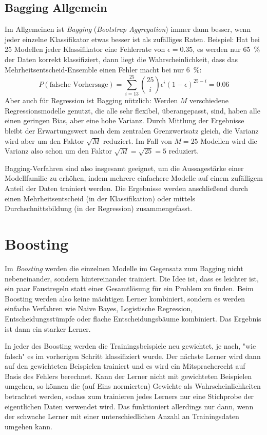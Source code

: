 		\subsection{Bagging Allgemein}
			Im Allgemeinen ist \emph{Bagging} (\emph{Bootstrap Aggregation}) immer dann besser, wenn jeder einzelne Klassifikator etwas besser ist als zufälliges Raten. Beispiel: Hat bei \num{25} Modellen jeder Klassifikator eine Fehlerrate von \(\epsilon = 0.35\), \dh es werden nur \SI{65}{\percent} der Daten korrekt klassifiziert, dann liegt die Wahrscheinlichkeit, dass das Mehrheitsentscheid-Ensemble einen Fehler macht bei nur \SI{6}{\percent}:
			\begin{equation}
				P(\text{falsche Vorhersage}) = \sum_{i = 13}^{25} { 25 \choose i } \epsilon^i (1 - \epsilon)^{25 - i} = 0.06
			\end{equation}
			Aber auch für Regression ist Bagging nützlich: Werden \(M\) verschiedene Regressionsmodelle genutzt, die alle sehr flexibel, \dh überangepasst, sind, haben alle einen geringen Bias, aber eine hohe Varianz. Durch Mittlung der Ergebnisse bleibt der Erwartungswert nach dem zentralen Grenzwertsatz gleich, die Varianz wird aber um den Faktor \(\sqrt{M}\) reduziert. Im Fall von \(M = 25\) Modellen wird die Varianz also schon um den Faktor \(\sqrt{M} = \sqrt{25} = 5\) reduziert.

			Bagging-Verfahren sind also insgesamt geeignet, um die Aussagestärke einer Modellfamilie zu erhöhen, indem mehrere einfachere Modelle auf einem zufälligem Anteil der Daten trainiert werden. Die Ergebnisse werden anschließend durch einen Mehrheitsentscheid (in der Klassifikation) oder mittels Durchschnittsbildung (in der Regression) zusammengefasst.

	\section{Boosting}
		Im \emph{Boosting} werden die einzelnen Modelle im Gegensatz zum Bagging nicht nebeneinander, sondern hintereinander trainiert. Die Idee ist, dass es leichter ist, ein paar Faustregeln statt einer Gesamtlösung für ein Problem zu finden. Beim Boosting werden also keine mächtigen Lerner kombiniert, sondern es werden einfache Verfahren wie Naive Bayes, Logistische Regression, Entscheidungsstümpfe oder flache Entscheidungsbäume kombiniert. Das Ergebnis ist dann ein starker Lerner.

		In jeder des Boosting werden die Trainingsbeispiele neu gewichtet, je nach, "wie falsch" es im vorherigen Schritt klassifiziert wurde. Der nächste Lerner wird dann auf den gewichteten Beispielen trainiert und es wird ein Mitspracherecht auf Basis des Fehlers berechnet. Kann der Lerner nicht mit gewichteten Beispielen umgehen, so können die (auf Eins normierten) Gewichte als Wahrscheinlichkeiten betrachtet werden, sodass zum trainieren jedes Lerners nur eine Stichprobe der eigentlichen Daten verwendet wird. Das funktioniert allerdings nur dann, wenn der schwache Lerner mit einer unterschiedlichen Anzahl an Trainingsdaten umgehen kann.

